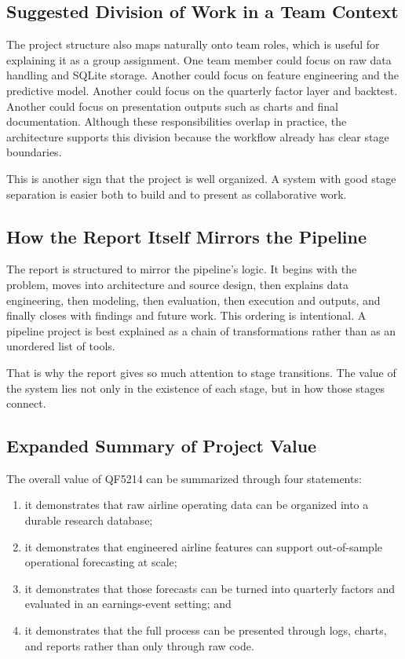 \documentclass[11pt,a4paper]{article}
\begin{document}
\subsection{Suggested Division of Work in a Team Context}

The project structure also maps naturally onto team roles, which is useful for
explaining it as a group assignment. One team member could focus on raw data
handling and SQLite storage. Another could focus on feature engineering and the
predictive model. Another could focus on the quarterly factor layer and
backtest. Another could focus on presentation outputs such as charts and final
documentation. Although these responsibilities overlap in practice, the
architecture supports this division because the workflow already has clear stage
boundaries.

This is another sign that the project is well organized. A system with good
stage separation is easier both to build and to present as collaborative work.

\subsection{How the Report Itself Mirrors the Pipeline}

The report is structured to mirror the pipeline’s logic. It begins with the
problem, moves into architecture and source design, then explains data
engineering, then modeling, then evaluation, then execution and outputs, and
finally closes with findings and future work. This ordering is intentional. A
pipeline project is best explained as a chain of transformations rather than as
an unordered list of tools.

That is why the report gives so much attention to stage transitions. The value
of the system lies not only in the existence of each stage, but in how those
stages connect.

\subsection{Expanded Summary of Project Value}

The overall value of QF5214 can be summarized through four statements:

\begin{enumerate}[leftmargin=*, label=(\alph*)]
  \item it demonstrates that raw airline operating data can be organized into a
  durable research database;
  \item it demonstrates that engineered airline features can support
  out-of-sample operational forecasting at scale;
  \item it demonstrates that those forecasts can be turned into quarterly
  factors and evaluated in an earnings-event setting; and
  \item it demonstrates that the full process can be presented through logs,
  charts, and reports rather than only through raw code.
\end{enumerate}
\end{document}
